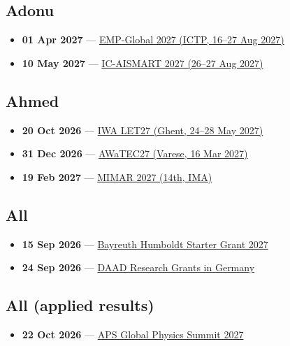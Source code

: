 \subsection*{Adonu}
\begin{itemize}[leftmargin=1.4em,itemsep=0.1em]
  \item \textbf{01 Apr 2027} --- \href{https://indico.ictp.it/event/11453}{EMP-Global 2027 (ICTP, 16--27 Aug 2027)}
  \item \textbf{10 May 2027} --- \href{https://www.ic-aismart.com/call-for-paper}{IC-AISMART 2027 (26--27 Aug 2027)}
\end{itemize}

\subsection*{Ahmed}
\begin{itemize}[leftmargin=1.4em,itemsep=0.1em]
  \item \textbf{20 Oct 2026} --- \href{https://ebnet.ac.uk/iwa-let27-abstracts-deadline/}{IWA LET27 (Ghent, 24--28 May 2027)}
  \item \textbf{31 Dec 2026} --- \href{https://awatec27.dista.uninsubria.it/}{AWaTEC27 (Varese, 16 Mar 2027)}
  \item \textbf{19 Feb 2027} --- \href{https://ima.org.uk/29258/14th-ima-international-conference-on-modelling-in-industrial-maintenance-and-reliability-mimar2027/}{MIMAR 2027 (14th, IMA)}
\end{itemize}

\subsection*{All}
\begin{itemize}[leftmargin=1.4em,itemsep=0.1em]
  \item \textbf{15 Sep 2026} --- \href{https://www.humboldt-centre.uni-bayreuth.de/en/applications/index.php}{Bayreuth Humboldt Starter Grant 2027}
  \item \textbf{24 Sep 2026} --- \href{https://www2.daad.de/deutschland/stipendium/datenbank/en/21148-scholarship-database/?detail=57742121}{DAAD Research Grants in Germany}
\end{itemize}

\subsection*{All (applied results)}
\begin{itemize}[leftmargin=1.4em,itemsep=0.1em]
  \item \textbf{22 Oct 2026} --- \href{https://summit.aps.org/attend/abstracts/}{APS Global Physics Summit 2027}
\end{itemize}

